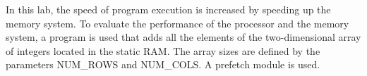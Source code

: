 In this lab, the speed of program execution is increased by speeding up the memory system. To evaluate the performance of the processor and the memory system, a program is used that adds all the elements of the two-\/dimensional array of integers located in the static R\+AM. The array sizes are defined by the parameters N\+U\+M\+\_\+\+R\+O\+WS and N\+U\+M\+\_\+\+C\+O\+LS. A prefetch module is used. 